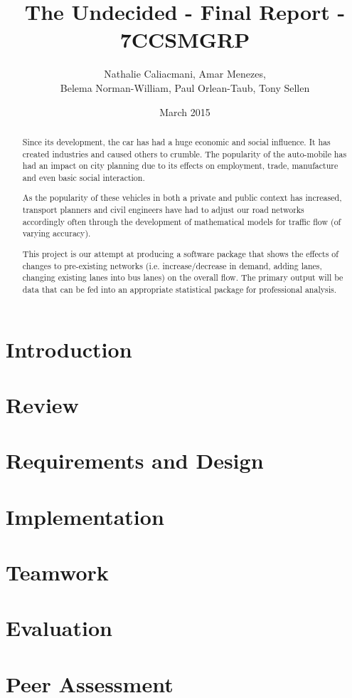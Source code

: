 \documentclass[titlepage]{article}
\title{The Undecided - Final Report - 7CCSMGRP}
\author{Nathalie Caliacmani, Amar Menezes, \\ Belema Norman-William, Paul Orlean-Taub, Tony Sellen}
\date{March 2015}
\begin{document}
\maketitle

\begin{abstract}
Since its development, the car has had a huge economic and social influence. It has created industries and caused others to crumble. The popularity of the auto-mobile has had an impact on city planning due to its effects on employment, trade, manufacture and even basic social interaction.

As the popularity of these vehicles in both a private and public context has increased, transport planners and civil engineers have had to adjust our road networks accordingly often through the development of mathematical models for traffic flow (of varying accuracy).

This project is our attempt at producing a software  package that shows the effects of changes to pre-existing networks (i.e. increase/decrease in demand, adding lanes, changing existing lanes into bus lanes) on the overall flow. The primary output will be data that can be fed into an appropriate statistical package for professional analysis.
\end{abstract}

\tableofcontents
\newpage

\section{Introduction}
	

\section{Review}
	
	
\section{Requirements and Design}
	
\section{Implementation}
	
\section{Teamwork}
	
\section{Evaluation}
	

\section{Peer Assessment}
	
	


\end{document}
